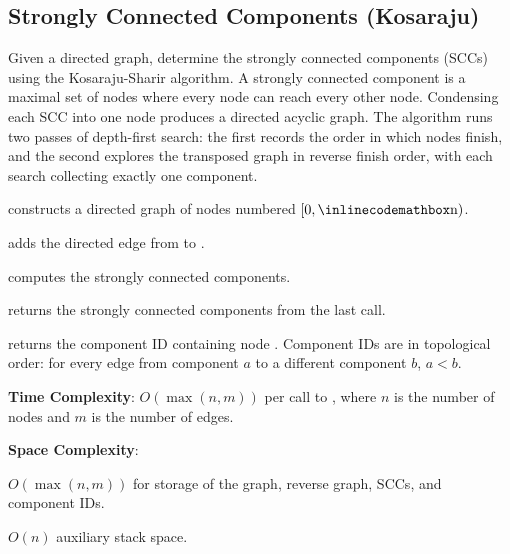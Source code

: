 \subsection{Strongly Connected Components (Kosaraju)}
\label{sec:4.2.2}
Given a directed graph, determine the strongly connected components (SCCs) using the Kosaraju-Sharir algorithm. A strongly connected component is a maximal set of nodes where every node can reach every other node. Condensing each SCC into one node produces a directed acyclic graph. The algorithm runs two passes of depth-first search: the first records the order in which nodes finish, and the second explores the transposed graph in reverse finish order, with each search collecting exactly one component.

\begin{compactitem}
  \item {} constructs a directed graph of  nodes numbered $[0, {\inlinecodemath{n}})$.
  \item {} adds the directed edge from  to .
  \item {} computes the strongly connected components.
  \item {} returns the strongly connected components from the last  call.
  \item {} returns the component ID containing node . Component IDs are in topological order: for every edge from component $a$ to a different component $b$, $a < b$.
\end{compactitem}

\textbf{Time Complexity}: $O(\max\left(n, m\right))$ per call to , where $n$ is the number of nodes and $m$ is the number of edges.

\textbf{Space Complexity}:
\begin{compactitem}
  \item $O(\max\left(n, m\right))$ for storage of the graph, reverse graph, SCCs, and component IDs.
  \item $O(n)$ auxiliary stack space.
\end{compactitem}

